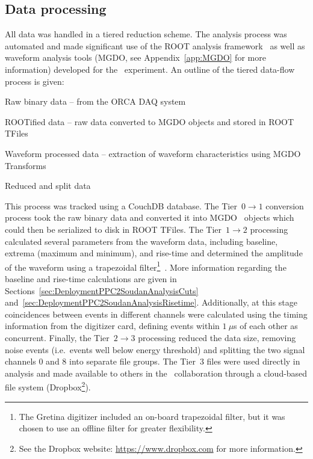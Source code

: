 		\subsection{Data processing}
		\label{sec:DeploymentPPC2DataProcessing}	
	
	All data was handled in a tiered reduction scheme.  The analysis process was automated and made significant use of the ROOT analysis framework~\cite{Bru97} as well as waveform analysis tools (MGDO, see Appendix~\ref{app:MGDO} for more information) developed for the \MJ~experiment.  An outline of the tiered data-flow process is given:
		\begin{description}\itemsep2pt
			\item[Tier 0:]  Raw binary data -- from the ORCA DAQ system
			\item[Tier 1:]  ROOTified data -- raw data converted to MGDO objects and stored in ROOT TFiles
			\item[Tier 2:]  Waveform processed data -- extraction of waveform characteristics using MGDO Transforms
			\item[Tier 3:]  Reduced and split data
		\end{description}	
		
	This process was tracked using a CouchDB database.  The Tier~$0\to1$ conversion process took the raw binary data and converted it into MGDO \cpp~objects which could then be serialized to disk in ROOT TFiles.  The Tier~$1\to2$ processing calculated several parameters from the waveform data, including baseline, extrema (maximum and minimum), and rise-time and determined the amplitude of the waveform using a trapezoidal filter\footnote{The Gretina digitizer included an on-board trapezoidal filter, but it was chosen to use an offline filter for greater flexibility.}~\cite{Jor94}.  More information regarding the baseline and rise-time calculations are given in Sections~\ref{sec:DeploymentPPC2SoudanAnalysisCuts} and~\ref{sec:DeploymentPPC2SoudanAnalysisRisetime}.  Additionally, at this stage coincidences between events in different channels were calculated using the timing information from the digitizer card, defining events within $1~\mu$s of each other as concurrent.   Finally, the Tier~$2\to3$ processing reduced the data size, removing noise events (i.e.~events well below energy threshold) and splitting the two signal channels 0 and 8 into separate file groups.  The Tier~3 files were used directly in analysis and made available to others in the \MJ~collaboration through a cloud-based file system (Dropbox\footnote{See the Dropbox website: \url{https://www.dropbox.com} for more information.}).
	
